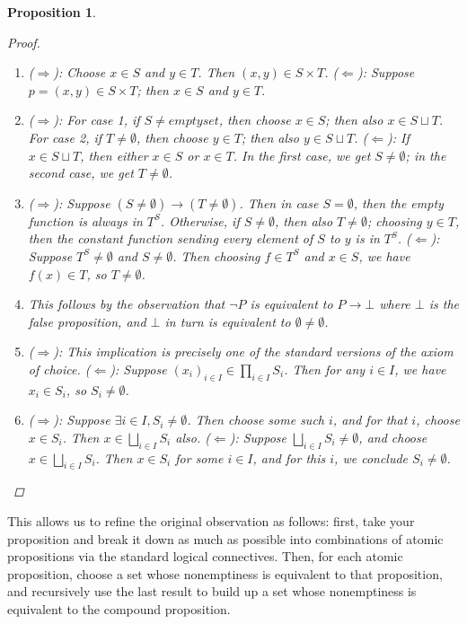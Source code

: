 \documentclass{article}
\newtheorem{proposition}{Proposition}
\theoremstyle{definition}
\begin{document}
\begin{proposition}
	\begin{proof}
	\begin{enumerate}
		\item ($\Rightarrow$): Choose $x\in S$ and $y\in T$.  Then $(x, y) \in S\times T$.  ($\Leftarrow$): Suppose $p = (x, y) \in S\times T$; then $x\in S$ and $y\in T$.
		\item ($\Rightarrow$): For case 1, if $S \ne emptyset$, then choose $x\in S$; then also $x\in S \sqcup T$.  For case 2, if $T \ne \emptyset$, then choose $y\in T$; then also $y\in S \sqcup T$.  ($\Leftarrow$): If $x \in S\sqcup T$, then either $x\in S$ or $x\in T$.  In the first case, we get $S\ne\emptyset$; in the second case, we get $T\ne\emptyset$.
		\item ($\Rightarrow$): Suppose $(S\ne\emptyset) \rightarrow (T\ne\emptyset)$.  Then in case $S=\emptyset$, then the empty function is always in $T^S$.  Otherwise, if $S\ne\emptyset$, then also $T\ne\emptyset$; choosing $y\in T$, then the constant function sending every element of $S$ to $y$ is in $T^S$.  ($\Leftarrow$): Suppose $T^S \ne \emptyset$ and $S\ne \emptyset$.  Then choosing $f\in T^S$ and $x\in S$, we have $f(x)\in T$, so $T\ne\emptyset$.
		\item This follows by the observation that $\lnot P$ is equivalent to $P \rightarrow \bot$ where $\bot$ is the false proposition, and $\bot$ in turn is equivalent to $\emptyset \ne \emptyset$.
		\item ($\Rightarrow$): This implication is precisely one of the standard versions of the axiom of choice.  ($\Leftarrow$): Suppose $(x_i)_{i\in I} \in \prod_{i\in I} S_i$.  Then for any $i\in I$, we have $x_i \in S_i$, so $S_i \ne \emptyset$.
		\item ($\Rightarrow$): Suppose $\exists i \in I, S_i \ne \emptyset$.  Then choose some such $i$, and for that $i$, choose $x\in S_i$.  Then $x\in \bigsqcup_{i\in I} S_i$ also.  ($\Leftarrow$): Suppose $\bigsqcup_{i\in I} S_i \ne \emptyset$, and choose $x \in \bigsqcup_{i\in I} S_i$.  Then $x\in S_i$ for some $i\in I$, and for this $i$, we conclude $S_i \ne \emptyset$.  
	\end{enumerate}
	\end{proof}\end{proposition}
	
	This allows us to refine the original observation as follows: first, take your proposition and break it down as much as possible into combinations of atomic propositions via the standard logical connectives.  Then, for each atomic proposition, choose a set whose nonemptiness is equivalent to that proposition, and recursively use the last result to build up a set whose nonemptiness is equivalent to the compound proposition.
	
\end{document}
